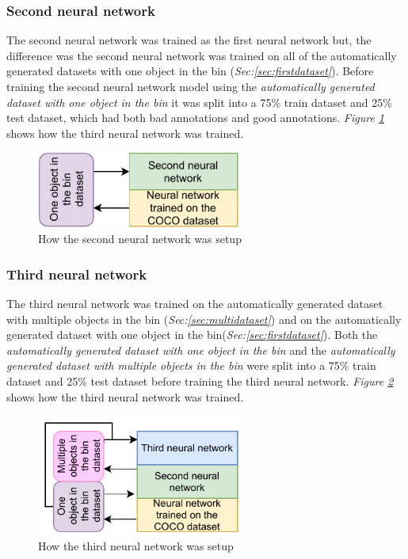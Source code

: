 \subsubsection{Second neural network}
The second neural network was trained as the first neural network but, the difference was the second neural network was trained on all of the automatically generated datasets with one object in the bin (\textit{Sec:\ref{sec:firstdataset}}). Before training the second neural network model using the \textit{automatically generated dataset with one object in the bin} it was split into a 75\% train dataset and 25\% test dataset, which had both bad annotations and good annotations. \textit{Figure \ref{fig:secondneural}} shows how the third neural network was trained.


\begin{figure}[h]
 \centering
 \includegraphics[width=0.6\textwidth]{graphics/results/secondneural.pdf}
 \caption{How the second neural network was setup}
 \label{fig:secondneural}
\end{figure}

\subsubsection{Third neural network}
The third neural network was trained on the automatically generated dataset with multiple objects in the bin (\textit{Sec:\ref{sec:multidataset}}) and on the automatically generated dataset with one object in the bin(\textit{Sec:\ref{sec:firstdataset}}). Both the \textit{automatically generated dataset with one object in the bin} and the \textit{automatically generated dataset with multiple objects in the bin} were split into a 75\% train dataset and 25\% test dataset before training the third neural network. \textit{Figure \ref{fig:thirdneural}} shows how the third neural network was trained.

\begin{figure}[h]
 \centering
 \includegraphics[width=0.6\textwidth]{graphics/results/thirdneural.pdf}
 \caption{How the third neural network was setup}
 \label{fig:thirdneural}
\end{figure}